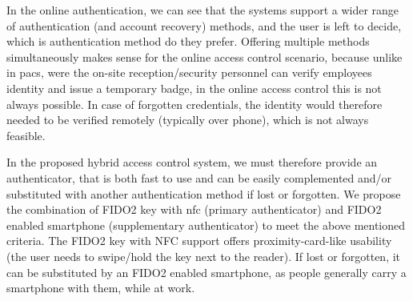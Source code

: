 In the online authentication, we can see that the systems support a wider range of authentication (and account recovery) methods, and the user is left to decide, which is authentication method do they prefer. Offering multiple methods simultaneously makes sense for the online access control scenario, because unlike in \acrshort{pacs}, were the on-site reception/security personnel can verify employees identity and issue a temporary badge, in the online access control this is not always possible. In case of forgotten credentials, the identity would therefore needed to be verified remotely (typically over phone), which is not always feasible.

In the proposed hybrid access control system, we must therefore provide an authenticator, that is both fast to use and can be easily complemented and/or substituted with another authentication method if lost or forgotten. We propose the combination of FIDO2 key with \acrshort{nfc} (primary authenticator) and FIDO2 enabled smartphone (supplementary authenticator) to meet the above mentioned criteria. The FIDO2 key with NFC support offers proximity-card-like usability (the user needs to swipe/hold the key next to the reader). If lost or forgotten, it can be substituted by an FIDO2 enabled smartphone, as people generally carry a smartphone with them, while at work.




